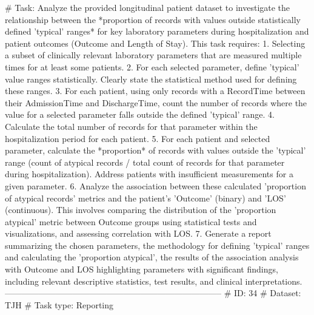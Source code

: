 \begin{tcolorbox}[colback=cadmiumgreen!5!white,colframe=forestgreen!75!white,breakable,title=\textit{Generated analytical tasks in task 4.}]
\begin{VerbatimWrap}
# Task: Analyze the provided longitudinal patient dataset to investigate the relationship between the *proportion of records with values outside statistically defined 'typical' ranges* for key laboratory parameters during hospitalization and patient outcomes (Outcome and Length of Stay). This task requires: 1. Selecting a subset of clinically relevant laboratory parameters that are measured multiple times for at least some patients. 2. For each selected parameter, define 'typical' value ranges statistically. Clearly state the statistical method used for defining these ranges. 3. For each patient, using only records with a RecordTime between their AdmissionTime and DischargeTime, count the number of records where the value for a selected parameter falls outside the defined 'typical' range. 4. Calculate the total number of records for that parameter within the hospitalization period for each patient. 5. For each patient and selected parameter, calculate the *proportion* of records with values outside the 'typical' range (count of atypical records / total count of records for that parameter during hospitalization). Address patients with insufficient measurements for a given parameter. 6. Analyze the association between these calculated 'proportion of atypical records' metrics and the patient's 'Outcome' (binary) and 'LOS' (continuous). This involves comparing the distribution of the 'proportion atypical' metric between Outcome groups using statistical tests and visualizations, and assessing correlation with LOS. 7. Generate a report summarizing the chosen parameters, the methodology for defining 'typical' ranges and calculating the 'proportion atypical', the results of the association analysis with Outcome and LOS highlighting parameters with significant findings, including relevant descriptive statistics, test results, and clinical interpretations.
-----------------------------------------------------------------------------
# ID: 34  
# Dataset: TJH 
# Task type: Reporting

\end{VerbatimWrap}
\end{tcolorbox}
